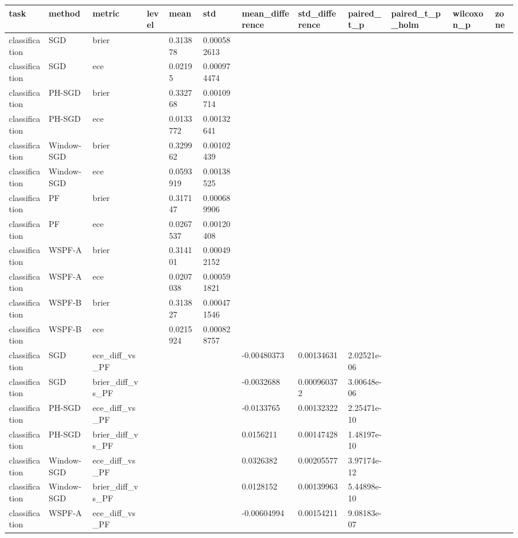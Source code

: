 \begin{tabular}{llllllllllll}
\hline
task & method & metric & level & mean & std & mean\_difference & std\_difference & paired\_t\_p & paired\_t\_p\_holm & wilcoxon\_p & zone \\
\hline
classification & SGD & brier &  & 0.313878 & 0.000582613 &  &  &  &  &  &  \\
classification & SGD & ece &  & 0.02195 & 0.000974474 &  &  &  &  &  &  \\
classification & PH-SGD & brier &  & 0.332768 & 0.00109714 &  &  &  &  &  &  \\
classification & PH-SGD & ece &  & 0.0133772 & 0.00132641 &  &  &  &  &  &  \\
classification & Window-SGD & brier &  & 0.329962 & 0.00102439 &  &  &  &  &  &  \\
classification & Window-SGD & ece &  & 0.0593919 & 0.00138525 &  &  &  &  &  &  \\
classification & PF & brier &  & 0.317147 & 0.000689906 &  &  &  &  &  &  \\
classification & PF & ece &  & 0.0267537 & 0.00120408 &  &  &  &  &  &  \\
classification & WSPF-A & brier &  & 0.314101 & 0.000492152 &  &  &  &  &  &  \\
classification & WSPF-A & ece &  & 0.0207038 & 0.000591821 &  &  &  &  &  &  \\
classification & WSPF-B & brier &  & 0.313827 & 0.000471546 &  &  &  &  &  &  \\
classification & WSPF-B & ece &  & 0.0215924 & 0.000828757 &  &  &  &  &  &  \\
classification & SGD & ece\_diff\_vs\_PF &  &  &  & -0.00480373 & 0.00134631 & 2.02521e-06 &  &  &  \\
classification & SGD & brier\_diff\_vs\_PF &  &  &  & -0.0032688 & 0.000960372 & 3.00648e-06 &  &  &  \\
classification & PH-SGD & ece\_diff\_vs\_PF &  &  &  & -0.0133765 & 0.00132322 & 2.25471e-10 &  &  &  \\
classification & PH-SGD & brier\_diff\_vs\_PF &  &  &  & 0.0156211 & 0.00147428 & 1.48197e-10 &  &  &  \\
classification & Window-SGD & ece\_diff\_vs\_PF &  &  &  & 0.0326382 & 0.00205577 & 3.97174e-12 &  &  &  \\
classification & Window-SGD & brier\_diff\_vs\_PF &  &  &  & 0.0128152 & 0.00139963 & 5.44898e-10 &  &  &  \\
classification & WSPF-A & ece\_diff\_vs\_PF &  &  &  & -0.00604994 & 0.00154211 & 9.08183e-07 &  &  &  \\

\end{tabular}
